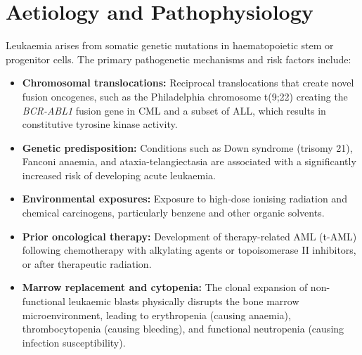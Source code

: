 \section*{Aetiology and Pathophysiology}
Leukaemia arises from somatic genetic mutations in haematopoietic stem or progenitor cells. The primary pathogenetic mechanisms and risk factors include:
\begin{itemize}
    \item \textbf{Chromosomal translocations:} Reciprocal translocations that create novel fusion oncogenes, such as the Philadelphia chromosome t(9;22) creating the \textit{BCR-ABL1} fusion gene in CML and a subset of ALL, which results in constitutive tyrosine kinase activity.
    \item \textbf{Genetic predisposition:} Conditions such as Down syndrome (trisomy 21), Fanconi anaemia, and ataxia-telangiectasia are associated with a significantly increased risk of developing acute leukaemia.
    \item \textbf{Environmental exposures:} Exposure to high-dose ionising radiation and chemical carcinogens, particularly benzene and other organic solvents.
    \item \textbf{Prior oncological therapy:} Development of therapy-related AML (t-AML) following chemotherapy with alkylating agents or topoisomerase II inhibitors, or after therapeutic radiation.
    \item \textbf{Marrow replacement and cytopenia:} The clonal expansion of non-functional leukaemic blasts physically disrupts the bone marrow microenvironment, leading to erythropenia (causing anaemia), thrombocytopenia (causing bleeding), and functional neutropenia (causing infection susceptibility).
\end{itemize}

